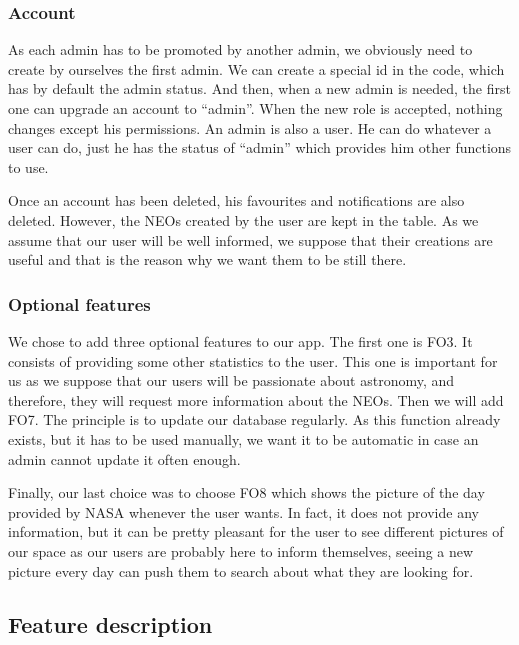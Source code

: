 \subsubsection{Account}

As each admin has to be promoted by another admin, we obviously need to create by ourselves the first admin.  We can create a special id in the code, which has by default the admin status. And then, when a new admin is needed, the first one can upgrade an account to “admin”. When the new role is accepted, nothing changes except his permissions. An admin is also a user. He can do whatever a user can do, just he has the status of “admin” which provides him other functions to use.



Once an account has been deleted, his favourites and notifications are also deleted. However, the NEOs created by the user are kept in the table. As we assume that our user will be well informed, we suppose that their creations are useful and that is the reason why we want them to be still there.

\subsubsection{Optional features}

We chose to add three optional features to our app. The first one is FO3. It consists of providing some other statistics to the user. This one is important for us as we suppose that our users will be passionate about astronomy, and therefore, they will request more information about the NEOs.
Then we will add FO7. The principle is to update our database regularly. As this function already exists, but it has to be used manually, we want it to be automatic in case an admin cannot update it often enough.



Finally, our last choice was to choose FO8 which shows the picture of the day provided by NASA whenever the user wants. In fact, it does not provide any information, but it can be pretty pleasant for the user to see different pictures of our space as our users are probably here to inform themselves, seeing a new picture every day can push them to search about what they are looking for.

\subsection{Feature description}

